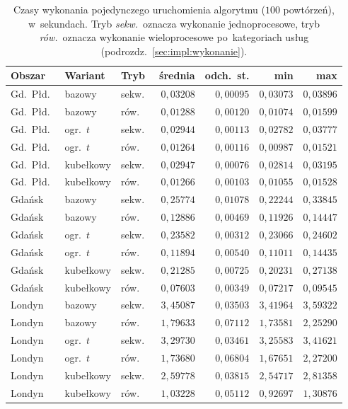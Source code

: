 \begin{table}[H]
\centering
\caption{Czasy wykonania pojedynczego uruchomienia algorytmu ($100$ powtórzeń),
w~sekundach. Tryb \emph{sekw.}\ oznacza wykonanie jednoprocesowe,
tryb \emph{rów.}\ oznacza wykonanie wieloprocesowe po~kategoriach usług
(podrozdz.~\ref{sec:impl:wykonanie}).}
\label{tab:wyniki:wszystkie}
\begin{tabular}{l l l r r r r}
\hline
\textbf{Obszar} & \textbf{Wariant} & \textbf{Tryb}
& \textbf{średnia} & \textbf{odch.\ st.} & \textbf{min} & \textbf{max} \\
\hline
Gd.\ Płd.\ & bazowy           & sekw.\ & $0{,}03208$ & $0{,}00095$ & $0{,}03073$ & $0{,}03896$ \\
Gd.\ Płd.\ & bazowy           & rów.\  & $0{,}01288$ & $0{,}00120$ & $0{,}01074$ & $0{,}01599$ \\
Gd.\ Płd.\ & ogr.\ $t$        & sekw.\ & $0{,}02944$ & $0{,}00113$ & $0{,}02782$ & $0{,}03777$ \\
Gd.\ Płd.\ & ogr.\ $t$        & rów.\  & $0{,}01264$ & $0{,}00116$ & $0{,}00987$ & $0{,}01521$ \\
Gd.\ Płd.\ & kubełkowy        & sekw.\ & $0{,}02947$ & $0{,}00076$ & $0{,}02814$ & $0{,}03195$ \\
Gd.\ Płd.\ & kubełkowy        & rów.\  & $0{,}01266$ & $0{,}00103$ & $0{,}01055$ & $0{,}01528$ \\
\hline
Gdańsk     & bazowy           & sekw.\ & $0{,}25774$ & $0{,}01078$ & $0{,}22244$ & $0{,}33845$ \\
Gdańsk     & bazowy           & rów.\  & $0{,}12886$ & $0{,}00469$ & $0{,}11926$ & $0{,}14447$ \\
Gdańsk     & ogr.\ $t$        & sekw.\ & $0{,}23582$ & $0{,}00312$ & $0{,}23066$ & $0{,}24602$ \\
Gdańsk     & ogr.\ $t$        & rów.\  & $0{,}11894$ & $0{,}00540$ & $0{,}11011$ & $0{,}14435$ \\
Gdańsk     & kubełkowy        & sekw.\ & $0{,}21285$ & $0{,}00725$ & $0{,}20231$ & $0{,}27138$ \\
Gdańsk     & kubełkowy        & rów.\  & $0{,}07603$ & $0{,}00349$ & $0{,}07217$ & $0{,}09545$ \\
\hline
Londyn     & bazowy           & sekw.\ & $3{,}45087$ & $0{,}03503$ & $3{,}41964$ & $3{,}59322$ \\
Londyn     & bazowy           & rów.\  & $1{,}79633$ & $0{,}07112$ & $1{,}73581$ & $2{,}25290$ \\
Londyn     & ogr.\ $t$        & sekw.\ & $3{,}29730$ & $0{,}03461$ & $3{,}25583$ & $3{,}41621$ \\
Londyn     & ogr.\ $t$        & rów.\  & $1{,}73680$ & $0{,}06804$ & $1{,}67651$ & $2{,}27200$ \\
Londyn     & kubełkowy        & sekw.\ & $2{,}59778$ & $0{,}03815$ & $2{,}54717$ & $2{,}81358$ \\
Londyn     & kubełkowy        & rów.\  & $1{,}03228$ & $0{,}05112$ & $0{,}92697$ & $1{,}30876$ \\
\hline
\end{tabular}
\end{table}

